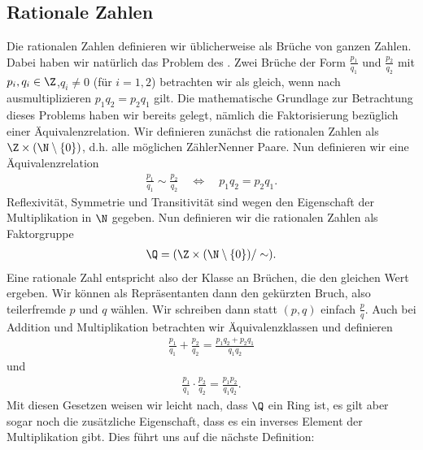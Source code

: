 \documentclass[letterpaper,10pt,english]{jupyterBook}
\begin{document}
\subsection{Rationale Zahlen}
\label{\detokenize{grundlagen/zahlensysteme:rationale-zahlen}}
Die rationalen Zahlen definieren wir üblicherweise als Brüche von ganzen Zahlen. Dabei haben wir natürlich das Problem des . Zwei Brüche der Form \(\frac{p_1}{q_1}\) und \(\frac{p_2}{q_2}\) mit \(p_i, q_i \in \Z\),\(q_i \neq 0\) (für \(i=1,2\)) betrachten wir als gleich, wenn nach ausmultiplizieren
\(p_1 q_2= p_2 q_1\) gilt.
Die mathematische Grundlage zur Betrachtung dieses Problems haben wir bereits gelegt, nämlich die Faktorisierung bezüglich einer Äquivalenzrelation. Wir definieren zunächst die rationalen Zahlen als \(\Z \times (\N \setminus \{0\})\), d.h. alle möglichen Zähler\sphinxhyphen{}Nenner Paare. Nun definieren wir eine Äquivalenzrelation
\begin{equation*}
\begin{split}\frac{p_1}{q_1} \sim \frac{p_2}{q_2}  \quad \Leftrightarrow \quad p_1 q_2= p_2 q_1.\end{split}
\end{equation*}
Reflexivität, Symmetrie und Transitivität sind wegen den Eigenschaft der Multiplikation in \(\N\) gegeben.
Nun definieren wir die rationalen Zahlen als Faktorgruppe
\begin{equation*}
\begin{split}\Q = ( \Z \times (\N \setminus \{0\}) /  \sim).\end{split}
\end{equation*}
Eine rationale Zahl entspricht also der Klasse an Brüchen, die den gleichen Wert ergeben. Wir können als Repräsentanten dann den gekürzten Bruch, also teilerfremde \(p\) und \(q\) wählen. Wir schreiben dann statt \((p,q)\) einfach \(\frac{p}q\). Auch bei Addition und Multiplikation betrachten wir Äquivalenzklassen und definieren
\begin{equation*}
\begin{split} \frac{p_1}{q_1} +   \frac{p_2}{q_2}  = \frac{p_1 q_2 + p_2 q_1}{q_1q_2}\end{split}
\end{equation*}
und
\begin{equation*}
\begin{split} \frac{p_1}{q_1}  \cdot  \frac{p_2}{q_2}  = \frac{p_1   p_2  }{q_1q_2} .\end{split}
\end{equation*}
Mit diesen Gesetzen weisen wir leicht nach, dass \(\Q\) ein Ring ist, es gilt aber sogar noch die zusätzliche Eigenschaft, dass es ein inverses Element der Multiplikation gibt. Dies führt uns auf die nächste Definition:
\end{document}

